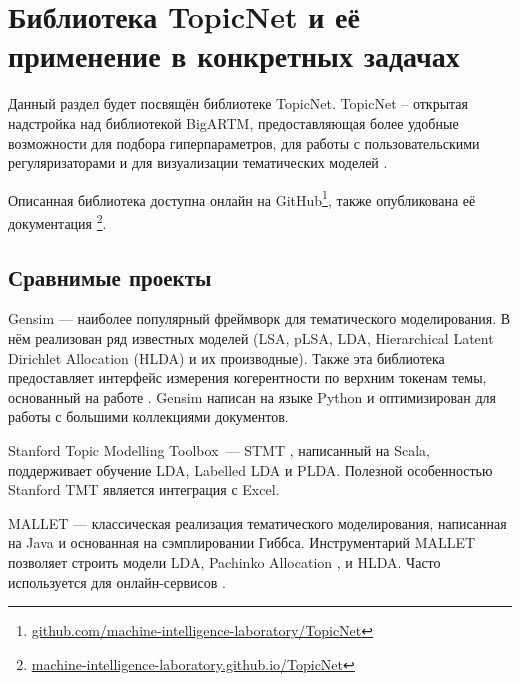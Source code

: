 \chapter{Библиотека TopicNet и её применение в конкретных задачах}

Данный раздел будет посвящён библиотеке TopicNet. TopicNet -- открытая надстройка над библиотекой BigARTM, предоставляющая более удобные возможности  для подбора гиперпараметров, для работы с пользовательскими регуляризаторами и для визуализации тематических моделей \cite{bulatov2020topicnet}. 

Описанная библиотека доступна онлайн на GitHub\footnote{\url{github.com/machine-intelligence-laboratory/TopicNet}}, также опубликована её документация \footnote{\url{machine-intelligence-laboratory.github.io/TopicNet} }.

\section{Сравнимые проекты}


Gensim \cite{rehurek_lrec} --- наиболее популярный фреймворк для тематического моделирования. В нём реализован ряд известных моделей (LSA, pLSA, LDA, Hierarchical Latent Dirichlet Allocation (HLDA) и их производные). Также эта библиотека предоставляет интерфейс измерения когерентности по верхним токенам темы, основанный на работе \cite{roder2015exploring}. Gensim написан на языке Python и оптимизирован для работы с большими коллекциями документов. 

Stanford Topic Modelling Toolbox~--- STMT \cite{stanfordtmt}, написанный на Scala, поддерживает обучение LDA, Labelled LDA и PLDA. Полезной особенностью Stanford TMT является интеграция с Excel.

MALLET \cite{mccallum2002mallet} --- классическая реализация тематического моделирования, написанная на Java и основанная на сэмплировании Гиббса. Инструментарий MALLET позволяет строить модели LDA, Pachinko Allocation \cite{li2006pachinko}, и HLDA. Часто используется для онлайн-сервисов \cite{pol2017towards}.

